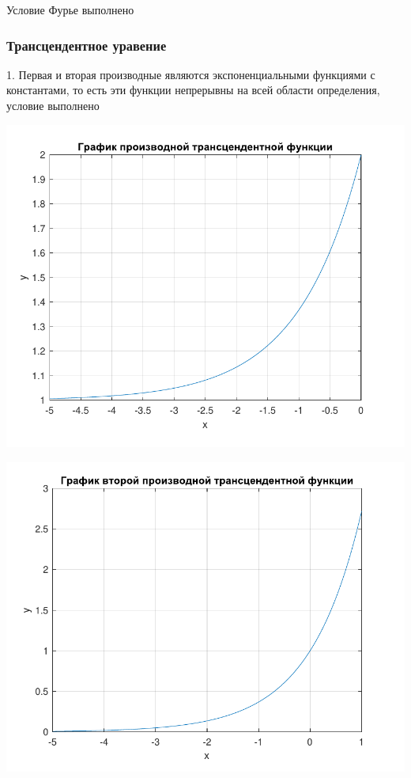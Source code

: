 Условие Фурье выполнено

\subsubsection {Трансцендентное уравение}

1. Первая и вторая производные являются экспоненциальными функциями с константами, то есть эти функции непрерывны на всей области определения, условие выполнено

\includegraphics[scale=0.75]{13.pdf}

\includegraphics[scale=0.75]{11.pdf}

